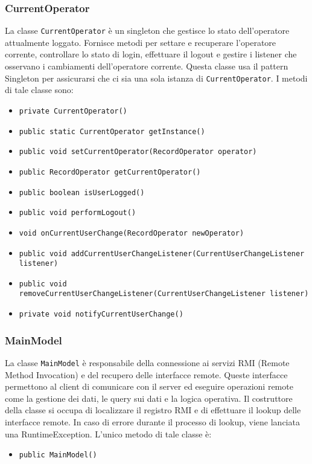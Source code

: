 \subsubsection{CurrentOperator}
La classe \texttt{CurrentOperator} è un singleton che gestisce lo stato dell'operatore attualmente loggato.
Fornisce metodi per settare e recuperare l'operatore corrente, controllare lo stato di login, effettuare il logout e gestire i listener che osservano i cambiamenti dell'operatore corrente.
Questa classe usa il pattern Singleton per assicurarsi che ci sia una sola istanza di \texttt{CurrentOperator}.
I metodi di tale classe sono:
\begin{itemize}
    \item \texttt{private CurrentOperator()}
    \item \texttt{public static CurrentOperator getInstance()}
    \item \texttt{public void setCurrentOperator(RecordOperator operator)}
    \item \texttt{public RecordOperator getCurrentOperator()}
    \item \texttt{public boolean isUserLogged()}
    \item \texttt{public void performLogout()}
    \item \texttt{void onCurrentUserChange(RecordOperator newOperator)}
    \item \texttt{public void addCurrentUserChangeListener(CurrentUserChangeListener listener)}
    \item \texttt{public void removeCurrentUserChangeListener(CurrentUserChangeListener listener)}
    \item \texttt{private void notifyCurrentUserChange()}
\end{itemize}

\subsubsection{MainModel}
La classe \texttt{MainModel} è responsabile della connessione ai servizi RMI (Remote Method Invocation) e del recupero delle interfacce remote. Queste interfacce permettono al client di comunicare con il server ed eseguire operazioni remote come la gestione dei dati, le query sui dati e la logica operativa.
Il costruttore della classe si occupa di localizzare il registro RMI e di effettuare il lookup delle interfacce remote. In caso di errore durante il processo di lookup, viene lanciata una RuntimeException.
L'unico metodo di tale classe è:
\begin{itemize}
    \item \texttt{public MainModel()}
\end{itemize}

